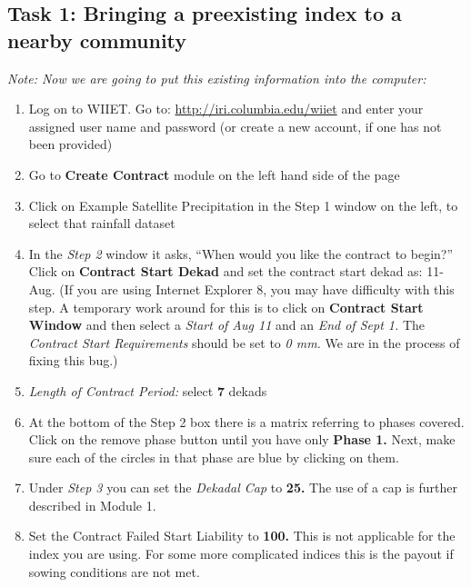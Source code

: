 \documentclass[letterpaper,10pt,english]{sphinxmanual}
\begin{document}
\subsection{Task 1: Bringing a preexisting index to a nearby community}
\label{wiiet/wiiet_usingfarmerinformation_Web:task-1-bringing-a-preexisting-index-to-a-nearby-community}
\emph{Note: Now we are going to put this existing information into the computer:}
\begin{enumerate}
\item {} 
Log on to WIIET. Go to: \href{http://iri.columbia.edu/wiiet}{http://iri.columbia.edu/wiiet} and enter your assigned user name and password (or create a new account, if one has not been provided)

\item {} 
Go to \textbf{Create Contract} module on the left hand side of the page

\item {} 
Click on Example Satellite Precipitation in the Step 1 window on the left, to select that rainfall dataset

\item {} 
In the \emph{Step 2} window it asks, ``When would you like the contract to begin?'' Click on \textbf{Contract Start Dekad} and set the contract start dekad as: 11-Aug. (If you are using Internet Explorer 8, you may have difficulty with this step. A temporary work around for this is to click on \textbf{Contract Start Window} and then select a \emph{Start of Aug 11} and an \emph{End of Sept 1.} The \emph{Contract Start Requirements} should be set to \emph{0 mm.} We are in the process of fixing this bug.)

\item {} 
\emph{Length of Contract Period:} select \textbf{7} dekads

\item {} 
At the bottom of the Step 2 box there is a matrix referring to phases covered. Click on the remove phase button until you have only \textbf{Phase 1.} Next, make sure each of the circles in that phase are blue by clicking on them.

\item {} 
Under \emph{Step 3} you can set the \emph{Dekadal Cap} to \textbf{25.} The use of a cap is further described in Module 1.

\item {} 
Set the Contract Failed Start Liability to \textbf{100.} This is not applicable for the index you are using. For some more complicated indices this is the payout if sowing conditions are not met.


\end{enumerate}
\end{document}
